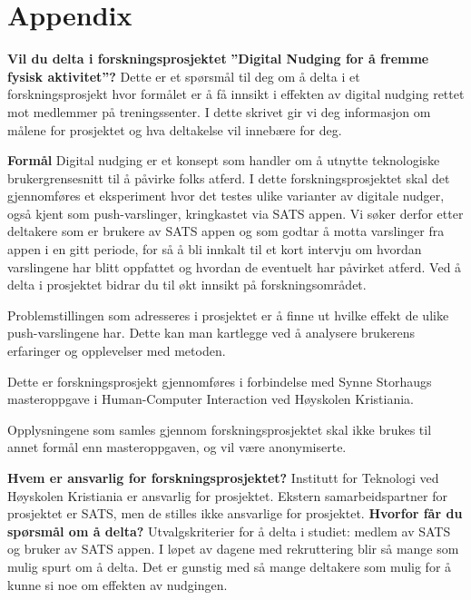 \chapter{Appendix}


%


\textbf{Vil du delta i forskningsprosjektet} \textbf{”Digital Nudging for å fremme fysisk aktivitet”?}
 \bigbreak
Dette er et spørsmål til deg om å delta i et forskningsprosjekt hvor formålet er å få innsikt i effekten av digital nudging rettet mot medlemmer på treningssenter. I dette skrivet gir vi deg informasjon om målene for prosjektet og hva deltakelse vil innebære for deg.
 
\textbf{Formål}
\bigbreak
Digital nudging er et konsept som handler om å utnytte teknologiske brukergrensesnitt til å påvirke folks atferd. I dette forskningsprosjektet skal det gjennomføres et eksperiment hvor det testes ulike varianter av digitale nudger, også kjent som push-varslinger, kringkastet via SATS appen. Vi søker derfor etter deltakere som er brukere av SATS appen og som godtar å motta varslinger fra appen i en gitt periode, for så å bli innkalt til et kort intervju om hvordan varslingene har blitt oppfattet og hvordan de eventuelt har påvirket atferd. Ved å delta i prosjektet bidrar du til økt innsikt på forskningsområdet. 
\bigbreak

Problemstillingen som adresseres i prosjektet er å finne ut hvilke effekt de ulike push-varslingene har. Dette kan man kartlegge ved å analysere brukerens erfaringer og opplevelser med metoden. 
\bigbreak

Dette er forskningsprosjekt gjennomføres i forbindelse med Synne Storhaugs masteroppgave i Human-Computer Interaction ved Høyskolen Kristiania.
\bigbreak
 
Opplysningene som samles gjennom forskningsprosjektet skal ikke brukes til annet formål enn masteroppgaven, og vil være anonymiserte. 
\bigbreak

\textbf{Hvem er ansvarlig for forskningsprosjektet?}
\bigbreak
Institutt for Teknologi ved Høyskolen Kristiania er ansvarlig for prosjektet.
Ekstern samarbeidspartner for prosjektet er SATS, men de stilles ikke ansvarlige for prosjektet.  
\textbf{Hvorfor får du spørsmål om å delta?}
\bigbreak
Utvalgskriterier for å delta i studiet: medlem av SATS og bruker av SATS appen. 
I løpet av dagene med rekruttering blir så mange som mulig spurt om å delta. Det er gunstig med så mange deltakere som mulig for å kunne si noe om effekten av nudgingen. 
 
